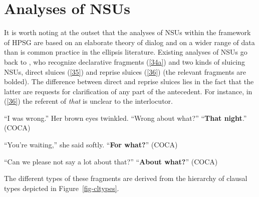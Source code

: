 {\section{Analyses of NSUs}
\label{sec-analyses-of-NSUs}

It is worth noting at the outset that the analyses of NSUs within the framework of HPSG are based on an elaborate theory of dialog \citep{Ginzburg1994, Ginzburg2004, Ginzburg2014a, Larsson2002, Purver2006, Fernandez2006, Fernandez2002, Fernandez2007, Ginzburg2010, Ginzburg2014b, Ginzburg2012, Ginzburg2013, Kim2019} and on a wider range of data than is common practice in the ellipsis literature. Existing analyses of NSUs go back to \citet{Ginzburg:Sag:2000}, who recognize declarative fragments (\ref{34a}) and two kinds of sluicing NSUs, direct sluices (\ref{35}) and reprise sluices (\ref{36}) (the relevant fragments are bolded). The difference between direct and reprise sluices lies in the fact that the latter are requests for clarification of any part of the antecedent. For instance, in (\ref{36}) the referent of \textit{that} is unclear to the interlocutor.

\ea ``I was wrong.'' Her brown eyes twinkled. ``Wrong about what?'' ``\textbf{That night}.'' (COCA) \label{34a}\z

\ea ``You're waiting,'' she said softly. ``\textbf{For what?}'' (COCA) \label{35} \z

\ea ``Can we please not say a lot about that?'' ``\textbf{About what?}'' (COCA) \label{36} \z


The different types of these fragments are derived from the \citet[333]{Ginzburg:Sag:2000} hierarchy of clausal types depicted in Figure~\ref{fig-cltypes}.


}

